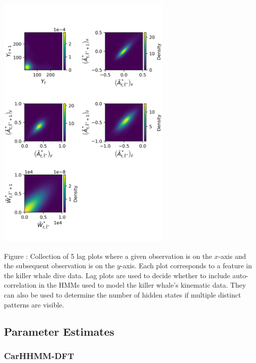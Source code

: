 \documentclass{article}
\begin{document}
        \begin{center}
        \includegraphics[height=5in]{../Plots/CarHHMM2_lagplot.png}
        \end{center}
        
        \noindent Figure : Collection of 5 lag plots where a given observation is on the $x$-axis and the subsequent observation is on the $y$-axis. Each plot corresponds to a feature in the killer whale dive data. Lag plots are used to decide whether to include auto-correlation in the HMMs used to model the killer whale's kinematic data. They can also be used to determine the number of hidden states if multiple distinct patterns are visible. 
        \addtocounter{fignum}{1}
        
        \newpage
    
    \subsection{Parameter Estimates}

        \subsubsection{CarHHMM-DFT}
        
\end{document}
